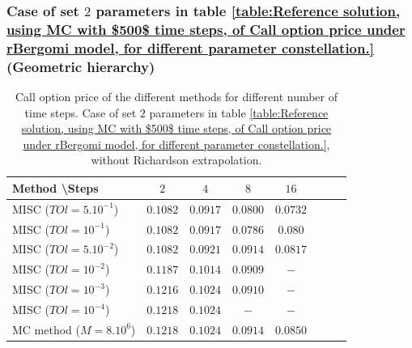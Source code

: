 \documentclass[11pt]{article}
\begin{document}
\subsubsection{Case of set $2$ parameters in table \ref{table:Reference solution, using MC with $500$ time steps, of Call option price under rBergomi model, for different parameter constellation.} (Geometric hierarchy)}
\label{sec:Case of set $2$ parameters}


\begin{table}[h!]
	\centering
	\begin{tabular}{l*{6}{c}r}
		Method \textbackslash  Steps            & $2$ & $4$ & $8$ & $16$  \\
		\hline
			MISC ($TOl=5.10^{-1}$)  & $0.1082$ & $0.0917$ & $0.0800$ & $0.0732$  \\
		MISC ($TOl=10^{-1}$)  & $0.1082$ & $0.0917$ & $0.0786$ & $0.080$  \\
			MISC ($TOl=5.10^{-2}$)  & $0.1082$ & $0.0921$ & $0.0914$ & $0.0817$  \\
		MISC ($TOl=10^{-2}$)  & $0.1187$ &  $0.1014$ & $0.0909$ & $-$  \\
		MISC ($TOl=10^{-3}$)        & $0.1216$ &$0.1024$ &  $0.0910$ &  $-$ \\
			MISC ($TOl=10^{-4}$)        & $0.1218$ &$0.1024$ &  $-$ &  $-$ \\
	\hline
		MC method ($M=8.10^{6}$)   & $0.1218 $  & $0.1024 $  & $0.0914$ & $0.0850 $ \\		
		\hline
	\end{tabular}
	\caption{ Call option price of the different methods for different number of time steps. Case of set $2$ parameters in table \ref{table:Reference solution, using MC with $500$ time steps, of Call option price under rBergomi model, for different parameter constellation.}, without Richardson extrapolation.}
	\label{table: Call option price of the different methods for different number of time steps. Case set 2}
\end{table}
\end{document}
